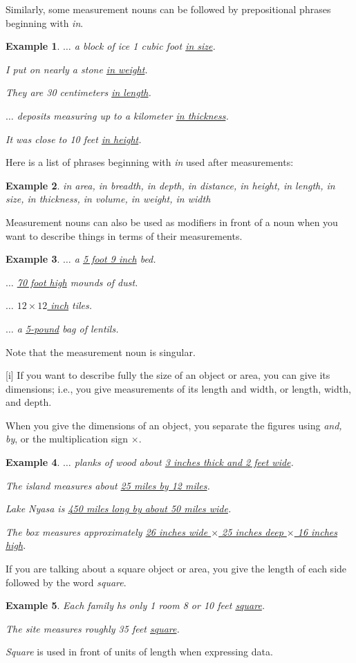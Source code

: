 \documentclass[oneside]{book}
\numberwithin{equation}{section}
\newtheorem{example}{Example}[section]
\begin{document}
%
\noindent{} Similarly, some measurement nouns can be followed by prepositional phrases beginning with \textit{in}.
\begin{example}
    $\ldots$ a block of ice 1 cubic foot \underline{in size}.
    
    I put on nearly a stone \underline{in weight}.
    
    They are 30 centimeters \underline{in length}.
    
    $\ldots$ deposits measuring up to a kilometer \underline{in thickness}.
    
    It was close to 10 feet \underline{in height}.
\end{example}
Here is a list of phrases beginning with \textit{in} used after measurements:
\begin{example}
    in area, in breadth, in depth, in distance, in height, in length, in size, in thickness, in volume, in weight, in width
\end{example}
%
\noindent{} Measurement nouns can also be used as modifiers in front of a noun when you want to describe things in terms of their measurements.
\begin{example}
    $\ldots$ a \underline{5 foot 9 inch} bed.
    
    $\ldots$ \underline{70 foot high} mounds of dust.
    
    $\ldots$ \underline{$12\times 12$ inch} tiles.
    
    $\ldots$ a \underline{5-pound} bag of lentils.
\end{example}
Note that the measurement noun is singular.

%
\noindent{} [i] If you want to describe fully the size of an object or area, you can give its dimensions; i.e., you give measurements of its length and width, or length, width, and depth.

When you give the dimensions of an object, you separate the figures using \textit{and, by}, or the multiplication sign $\times$.
\begin{example}
    $\ldots$ planks of wood about \underline{3 inches thick and 2 feet wide}.
    
    The island measures about \underline{25 miles by 12 miles}.
    
    Lake Nyasa is \underline{450 miles long by about 50 miles wide}.
    
    The box measures approximately \underline{26 inches wide $\times$ 25 inches deep $\times$ 16 inches high}.
\end{example}
If you are talking about a square object or area, you give the length of each side followed by the word \textit{square}.
\begin{example}
    Each family hs only 1 room 8 or 10 feet \underline{square}.
    
    The site measures roughly 35 feet \underline{square}.
\end{example}
\textit{Square} is used in front of units of length when expressing data.
\end{document}
